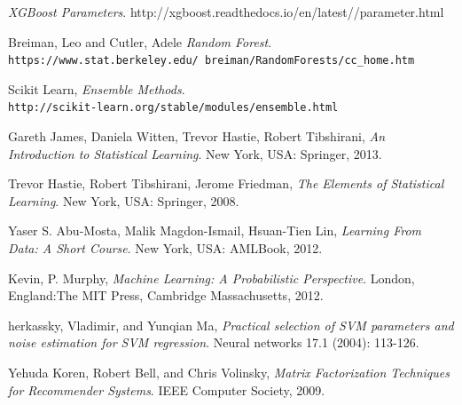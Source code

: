 \documentclass{article}
\begin{document}
\begin{spacing}{1}
\begin{large}
\begin{thebibliography}{9}
	\emph{XGBoost Parameters}.
	http://xgboost.readthedocs.io/en/latest//parameter.html
	
	Breiman, Leo and Cutler, Adele 
	\textit{Random Forest}. 
	\\\texttt{https://www.stat.berkeley.edu/~breiman/RandomForests/cc\_home.htm}
	
	Scikit Learn,
	\textit{Ensemble Methods}. 
	\\\texttt{http://scikit-learn.org/stable/modules/ensemble.html}
	
	Gareth James, Daniela Witten, Trevor Hastie, Robert Tibshirani, \textit{An Introduction to Statistical Learning}. New York, USA: Springer, 2013.
	
	Trevor Hastie, Robert Tibshirani, Jerome Friedman, \textit{The Elements of Statistical Learning}. New York, USA: Springer, 2008.
	
	Yaser S. Abu-Mosta, Malik Magdon-Ismail, Hsuan-Tien Lin, \textit{Learning From Data: A Short Course}. New York, USA: AMLBook, 2012.
	
	Kevin, P. Murphy, \textit{Machine Learning: A Probabilistic Perspective}. London, England:The MIT Press, Cambridge Massachusetts, 2012.
	
	herkassky, Vladimir, and Yunqian Ma, \textit{Practical selection of SVM parameters and noise estimation for SVM regression}. Neural networks 17.1 (2004): 113-126.
	
	Yehuda Koren, Robert Bell, and  Chris Volinsky, 
	\textit{Matrix Factorization Techniques for Recommender Systems}. IEEE Computer Society, 2009.
\end{thebibliography}

\end{large}
\end{spacing}
\end{document}
